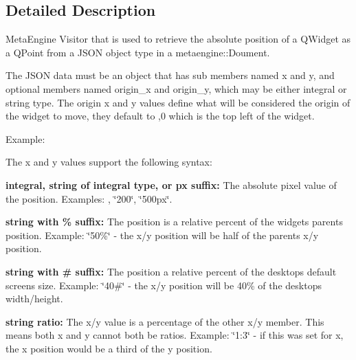 \subsection{Detailed Description}
Meta\+Engine Visitor that is used to retrieve the absolute position of a Q\+Widget as a Q\+Point from a J\+S\+O\+N object type in a metaengine\+::\+Doument. 

The J\+S\+O\+N data must be an object that has sub members named {\ttfamily x} and {\ttfamily y}, and optional members named {\ttfamily origin\+\_\+x} and {\ttfamily origin\+\_\+y}, which may be either integral or string type. The origin x and y values define what will be considered the origin of the widget to move, they default to {,0} which is the top left of the widget.

Example\+:




The x and y values support the following syntax\+:


\begin{DoxyItemize}
\item {\bfseries integral, string of integral type, or {\ttfamily px} suffix\+:} The absolute pixel value of the position. Examples\+: {}, {\ttfamily \char`\"{}200\char`\"{}}, {\ttfamily \char`\"{}500px\char`\"{}}.
\item {\bfseries string with {\ttfamily \%} suffix\+:} The position is a relative percent of the widget\textquotesingle{}s parent\textquotesingle{}s position. Example\+: {\ttfamily \char`\"{}50\%\char`\"{}} -\/ the x/y position will be half of the parent\textquotesingle{}s x/y position.
\item {\bfseries string with {\ttfamily \#} suffix\+:} The position a relative percent of the desktop\textquotesingle{}s default screen\textquotesingle{}s size. Example\+: {\ttfamily \char`\"{}40\#\char`\"{}} -\/ the x/y position will be 40\% of the desktop\textquotesingle{}s width/height.
\item {\bfseries string ratio\+: } The x/y value is a percentage of the other x/y member. This means both x and y cannot both be ratios. Example\+: {\ttfamily \char`\"{}1\+:3\char`\"{}} -\/ if this was set for x, the x position would be a third of the y position.
\end{DoxyItemize}

